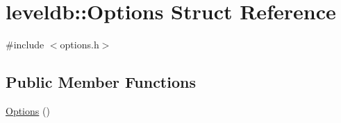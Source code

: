 \hypertarget{structleveldb_1_1_options}{}\section{leveldb\+:\+:Options Struct Reference}
\label{structleveldb_1_1_options}


{\ttfamily \#include $<$options.\+h$>$}

\subsection*{Public Member Functions}
\begin{DoxyCompactItemize}
\item 
\hyperlink{structleveldb_1_1_options_a52d77c894795ba83077045daeab3d581}{Options} ()
\end{DoxyCompactItemize}
